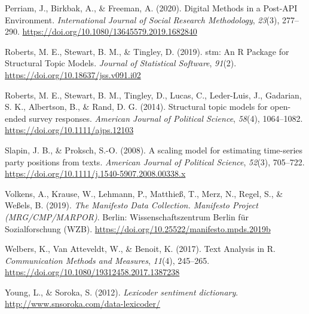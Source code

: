 \documentclass[
]{book}
\newlength{\cslhangindent}
\newenvironment{CSLReferences}[2] %
 {\begin{list}{}{%
  \setlength{\itemindent}{0pt}
  \setlength{\leftmargin}{0pt}
  \setlength{\parsep}{0pt}
  \ifodd #1
   \setlength{\leftmargin}{\cslhangindent}
   \setlength{\itemindent}{-1\cslhangindent}
  \fi
  \setlength{\itemsep}{#2\baselineskip}}}
 {\end{list}}
\begin{document}
\begin{CSLReferences}{1}{2}
Perriam, J., Birkbak, A., \& Freeman, A. (2020). {Digital Methods in a Post-API Environment}. \emph{International Journal of Social Research Methodology}, \emph{23}(3), 277--290. \url{https://doi.org/10.1080/13645579.2019.1682840}

Roberts, M. E., Stewart, B. M., \& Tingley, D. (2019). {stm: An R Package for Structural Topic Models}. \emph{Journal of Statistical Software}, \emph{91}(2). \url{https://doi.org/10.18637/jss.v091.i02}

Roberts, M. E., Stewart, B. M., Tingley, D., Lucas, C., Leder-Luis, J., Gadarian, S. K., Albertson, B., \& Rand, D. G. (2014). Structural topic models for open-ended survey responses. \emph{American Journal of Political Science}, \emph{58}(4), 1064--1082. \url{https://doi.org/10.1111/ajps.12103}

Slapin, J. B., \& Proksch, S.-O. (2008). A scaling model for estimating time-series party positions from texts. \emph{American Journal of Political Science}, \emph{52}(3), 705--722. \url{https://doi.org/10.1111/j.1540-5907.2008.00338.x}

Volkens, A., Krause, W., Lehmann, P., Matthieß, T., Merz, N., Regel, S., \& Weßels, B. (2019). \emph{{The Manifesto Data Collection. Manifesto Project (MRG/CMP/MARPOR)}}. Berlin: Wissenschaftszentrum Berlin f{ü}r Sozialforschung (WZB). \url{https://doi.org/10.25522/manifesto.mpds.2019b}

Welbers, K., Van Atteveldt, W., \& Benoit, K. (2017). {Text Analysis in R}. \emph{Communication Methods and Measures}, \emph{11}(4), 245--265. \url{https://doi.org/10.1080/19312458.2017.1387238}

Young, L., \& Soroka, S. (2012). \emph{Lexicoder sentiment dictionary}. \url{http://www.snsoroka.com/data-lexicoder/}

\end{CSLReferences}
\end{document}
